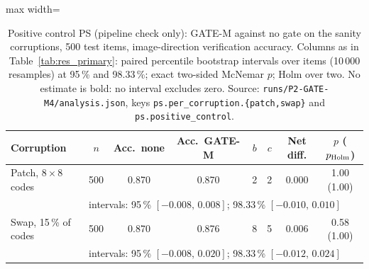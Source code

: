 \begin{table}[!tbp]
\centering
\caption{Positive control PS (pipeline check only): GATE-M against no gate on the sanity corruptions, 500 test items, image-direction
verification accuracy. Columns as in Table~\ref{tab:res_primary}: paired percentile bootstrap intervals over items (10\,000
resamples) at 95\,\% and 98.33\,\%; exact two-sided McNemar $p$; Holm over two. No estimate is bold: no interval excludes zero. Source:
\nolinkurl{runs/P2-GATE-M4/analysis.json}, keys \nolinkurl{ps.per_corruption.{patch,swap}} and \nolinkurl{ps.positive_control}.}
\label{tab:res_ps}
\footnotesize
\begin{adjustbox}{max width=\textwidth}
\begin{tabular}{lccccccc}
\toprule
Corruption & $n$ & Acc.\ none & Acc.\ GATE-M & $b$ & $c$ & Net diff. & $p$ ($p_{\rm Holm}$) \\
\midrule
Patch, $8\times8$ codes & 500 & 0.870 & 0.870 & 2 & 2 & $0.000$ & 1.00 (1.00) \\
& \multicolumn{7}{l}{\scriptsize intervals: 95\,\% $[-0.008,\,0.008]$; 98.33\,\% $[-0.010,\,0.010]$} \\
Swap, 15\,\% of codes & 500 & 0.870 & 0.876 & 8 & 5 & $0.006$ & 0.58 (1.00) \\
& \multicolumn{7}{l}{\scriptsize intervals: 95\,\% $[-0.008,\,0.020]$; 98.33\,\% $[-0.012,\,0.024]$} \\
\bottomrule
\end{tabular}
\end{adjustbox}
\end{table}

